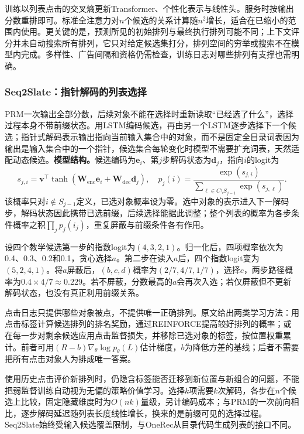 训练以列表点击的交叉熵更新Transformer、个性化表示与线性头。服务时按输出分数重排即可。标准全注意力对$n$个候选的关系计算随$n^2$增长，适合在已缩小的范围内使用。更关键的是，预测所见的初始排列与最终执行排列可能不同；上下文评分并未自动搜索所有排列，它只对给定候选集打分，排列空间的穷举或搜索不在模型内完成。多样性、广告间隔和资格仍需检查，训练日志对哪些排列有支撑也需明确。

\subsubsection{Seq2Slate：指针解码的列表选择}
\label{sec:rs-seq2slate}

PRM一次输出全部分数，后续对象不能在选择时重新读取“已经选了什么”，选择过程本身不带前缀状态。用LSTM编码候选，再由另一个LSTM逐步选择下一个候选；指针式解码表示输出指向当前输入集合中的对象，而不是固定全目录词表因为输出是输入集合中的一个指针，候选集合每轮变化时模型不需要扩充词表，天然适配动态候选。\textbf{模型结构。}候选编码为$\bm e_i$、第$j$步解码状态为$\bm d_j$，指向$i$的logit为
\begin{equation}
 s_{j,i}=\bm v^\top\tanh(\bm W_{\mathrm{enc}}\bm e_i+
                          \bm W_{\mathrm{dec}}\bm d_j),
 \quad
 p_j(i)=\frac{\exp(s_{j,i})}
 {\sum_{\ell\in C\setminus S_{j-1}}\exp(s_{j,\ell})}.
 \label{eq:rs-seq2slate}
\end{equation}
该概率只对$i\notin S_{j-1}$定义，已选对象概率设为零。选中对象的表示进入下一解码步，解码状态因此携带已选前缀，后续选择能据此调整；整个列表的概率为各步条件概率之积$\prod_j p_j(i_j)$，重复屏蔽与前缀条件各有作用。

设四个教学候选第一步的指数logit为$(4,3,2,1)$。归一化后，四项概率依次为0.4、0.3、0.2和0.1，贪心选择$a$。第二步在读入$a$后，四个指数logit变为$(5,2,4,1)$。将$a$屏蔽后，$(b,c,d)$概率为$(2/7,4/7,1/7)$，选择$c$，两步路径概率为$0.4\times4/7\approx0.229$。若不屏蔽，分数最高的$a$会再次入选；若仅屏蔽但不更新解码状态，也没有真正利用前缀关系。

点击日志只提供哪些对象被点，不提供唯一正确排列。原文给出两类学习方法：用点击标签计算候选排列的排名奖励，通过REINFORCE提高较好排列的概率；或在每一步对剩余候选应用点击监督损失，并移除已选对象的标签，按位置权重累计。前者可用$(R-b)\nabla_\theta\log p_\theta(L)$估计梯度，$b$为降低方差的基线；后者不需要把所有点击对象人为排成唯一答案。

使用历史点击评价新排列时，仍隐含标签能否迁移到新位置与新组合的问题，不能把弱监督训练自动视为无偏的策略价值学习。选择$k$项需要$k$次解码，各步在$n$个候选上比较，固定隐藏维度时为$O(nk)$量级，另计编码成本；与PRM的一次前向相比，逐步解码延迟随列表长度线性增长，换来的是前缀可见的选择过程。Seq2Slate始终受输入候选覆盖限制，与OneRec从目录代码生成列表的接口不同。

